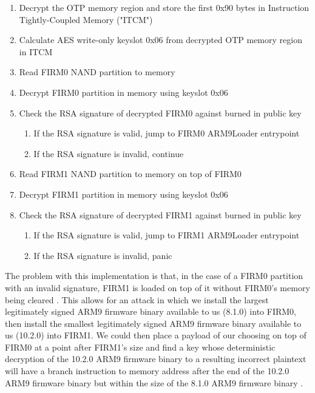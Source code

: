 \documentclass[journal]{IEEEtran}
\begin{document}
\medskip
\begin{enumerate}
  \item Decrypt the OTP memory region and store the first 0x90 bytes in
  Instruction Tightly-Coupled Memory ("ITCM")\cite{OTP_Registers}
  \item Calculate AES write-only keyslot 0x06 from decrypted OTP memory region
  in ITCM
  \item Read FIRM0 NAND partition to memory
  \item Decrypt FIRM0 partition in memory using keyslot 0x06
  \item Check the RSA signature of decrypted FIRM0 against burned in public key
    \begin{enumerate}
    \item If the RSA signature is valid, jump to FIRM0 ARM9Loader entrypoint
    \item If the RSA signature is invalid, continue
    \end{enumerate}
  \item Read FIRM1 NAND partition to memory on top of FIRM0
  \item Decrypt FIRM1 partition in memory using keyslot 0x06
  \item Check the RSA signature of decrypted FIRM1 against burned in public key
    \begin{enumerate}
    \item If the RSA signature is valid, jump to FIRM1 ARM9Loader entrypoint
    \item If the RSA signature is invalid, panic
    \end{enumerate}
\end{enumerate}
\medskip

The problem with this implementation is that, in the case of a FIRM0 partition
with an invalid signature, FIRM1 is loaded on top of it without FIRM0's memory
being cleared \cite{32c3}. This allows for an attack in which we install the
largest legitimately signed ARM9 firmware binary available to us (8.1.0) into
FIRM0, then install the smallest legitimately signed ARM9 firmware binary
available to us (10.2.0) into FIRM1. We could then place a payload of our
choosing on top of FIRM0 at a point after FIRM1's size and find a key whose
deterministic decryption of the 10.2.0 ARM9 firmware binary to a resulting
incorrect plaintext will have a branch instruction to memory address after the
end of the 10.2.0 ARM9 firmware binary but within the size of the 8.1.0 ARM9
firmware binary \cite{32c3}.
\end{document}
